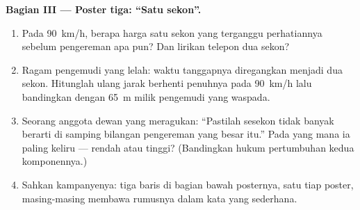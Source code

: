\begin{problem}
\medskip\noindent\textbf{Bagian III --- Poster tiga: ``Satu
sekon''.}
\begin{enumerate}[resume]
  \item Pada \qty{90}{km/h}, berapa  harga satu sekon yang
        terganggu perhatiannya sebelum pengereman apa pun? Dan lirikan
        telepon dua sekon?
  \item Ragam pengemudi yang lelah: waktu tanggapnya diregangkan
        menjadi dua sekon. Hitunglah ulang jarak berhenti penuhnya
        pada \qty{90}{km/h} lalu bandingkan dengan \qty{65}{m} milik
        pengemudi yang waspada.
  \item Seorang anggota dewan yang meragukan: ``Pastilah sesekon
        tidak banyak berarti di samping bilangan pengereman yang
        besar itu.'' Pada  yang mana ia paling keliru ---
        rendah atau tinggi? (Bandingkan hukum pertumbuhan kedua
        komponennya.)
  \item Sahkan kampanyenya: tiga baris di bagian bawah posternya,
        satu tiap poster, masing-masing membawa rumusnya dalam kata
        yang sederhana.
\end{enumerate}
\end{problem}
